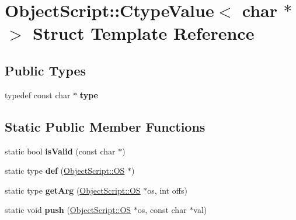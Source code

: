 \hypertarget{struct_object_script_1_1_ctype_value_3_01char_01_5_01_4}{}\section{Object\+Script\+:\+:Ctype\+Value$<$ char $\ast$ $>$ Struct Template Reference}
\label{struct_object_script_1_1_ctype_value_3_01char_01_5_01_4}
\subsection*{Public Types}
\begin{DoxyCompactItemize}
\item 
typedef const char $\ast$ {\bfseries type}\hypertarget{struct_object_script_1_1_ctype_value_3_01char_01_5_01_4_a42690405c490e978f99b444dc765ee60}{}\label{struct_object_script_1_1_ctype_value_3_01char_01_5_01_4_a42690405c490e978f99b444dc765ee60}

\end{DoxyCompactItemize}
\subsection*{Static Public Member Functions}
\begin{DoxyCompactItemize}
\item 
static bool {\bfseries is\+Valid} (const char $\ast$)\hypertarget{struct_object_script_1_1_ctype_value_3_01char_01_5_01_4_ab5d7db987af248edebfb6e0e6fde42eb}{}\label{struct_object_script_1_1_ctype_value_3_01char_01_5_01_4_ab5d7db987af248edebfb6e0e6fde42eb}

\item 
static type {\bfseries def} (\hyperlink{class_object_script_1_1_o_s}{Object\+Script\+::\+OS} $\ast$)\hypertarget{struct_object_script_1_1_ctype_value_3_01char_01_5_01_4_a918441efd3cc749a2a54ede5e0590129}{}\label{struct_object_script_1_1_ctype_value_3_01char_01_5_01_4_a918441efd3cc749a2a54ede5e0590129}

\item 
static type {\bfseries get\+Arg} (\hyperlink{class_object_script_1_1_o_s}{Object\+Script\+::\+OS} $\ast$os, int offs)\hypertarget{struct_object_script_1_1_ctype_value_3_01char_01_5_01_4_aad619257c5358640fa29bee8b735fb65}{}\label{struct_object_script_1_1_ctype_value_3_01char_01_5_01_4_aad619257c5358640fa29bee8b735fb65}

\item 
static void {\bfseries push} (\hyperlink{class_object_script_1_1_o_s}{Object\+Script\+::\+OS} $\ast$os, const char $\ast$val)\hypertarget{struct_object_script_1_1_ctype_value_3_01char_01_5_01_4_a4fb9a158725643ff2e4d655d6abfa3e4}{}\label{struct_object_script_1_1_ctype_value_3_01char_01_5_01_4_a4fb9a158725643ff2e4d655d6abfa3e4}

\end{DoxyCompactItemize}


